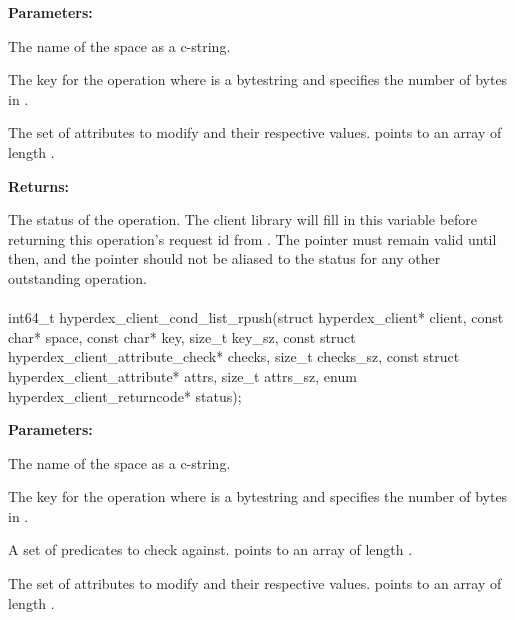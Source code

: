 \noindent\textbf{Parameters:}
\begin{description}[labelindent=\widthof{{\code{attrs}, \code{attrs\_sz}}},leftmargin=*,noitemsep,nolistsep,align=right]
\item[\code{space}] The name of the space as a c-string.
\item[\code{key}, \code{key\_sz}] The key for the operation where  is a bytestring and  specifies the number of bytes in .
\item[\code{attrs}, \code{attrs\_sz}] The set of attributes to modify and their respective values.   points to an array of length .
\end{description}

\noindent\textbf{Returns:}
\begin{description}[labelindent=\widthof{{\code{status}}},leftmargin=*,noitemsep,nolistsep,align=right]
\item[\code{status}] The status of the operation.  The client library will fill in this variable before returning this operation's request id from .  The pointer must remain valid until then, and the pointer should not be aliased to the status for any other outstanding operation.
\end{description}

\paragraph{}
\begin{ccode}
int64_t hyperdex_client_cond_list_rpush(struct hyperdex_client* client,
                const char* space,
                const char* key, size_t key_sz,
                const struct hyperdex_client_attribute_check* checks, size_t checks_sz,
                const struct hyperdex_client_attribute* attrs, size_t attrs_sz,
                enum hyperdex_client_returncode* status);
\end{ccode}
\funcdesc 

\noindent\textbf{Parameters:}
\begin{description}[labelindent=\widthof{{\code{checks}, \code{checks\_sz}}},leftmargin=*,noitemsep,nolistsep,align=right]
\item[\code{space}] The name of the space as a c-string.
\item[\code{key}, \code{key\_sz}] The key for the operation where  is a bytestring and  specifies the number of bytes in .
\item[\code{checks}, \code{checks\_sz}] A set of predicates to check against.   points to an array of length .
\item[\code{attrs}, \code{attrs\_sz}] The set of attributes to modify and their respective values.   points to an array of length .
\end{description}

